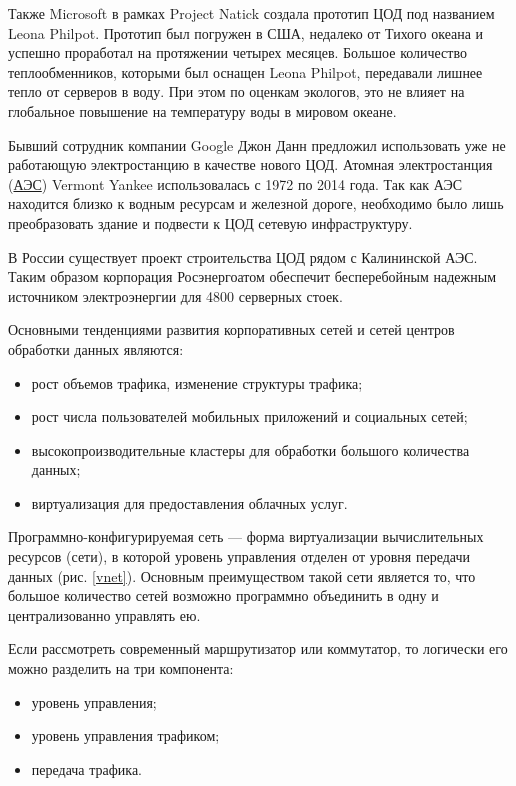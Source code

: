 Также Microsoft в рамках Project Natick создала прототип ЦОД под названием Leona Philpot.
Прототип был погружен в США, недалеко от Тихого океана и успешно проработал на протяжении четырех месяцев.
Большое количество теплообменников, которыми был оснащен Leona Philpot, передавали лишнее тепло от серверов в воду.
При этом по оценкам экологов, это не влияет на глобальное повышение на температуру воды в мировом океане.

Бывший сотрудник компании Google Джон Данн предложил использовать уже не работающую электростанцию в качестве нового ЦОД.
Атомная электростанция (\hyperlink{aes}{АЭС}) Vermont Yankee использовалась с 1972 по 2014 года.
Так как АЭС находится близко к водным ресурсам и железной дороге, необходимо было лишь преобразовать здание и подвести к ЦОД сетевую инфраструктуру.

В России существует проект строительства ЦОД рядом с Калининской АЭС.
Таким образом корпорация Росэнергоатом обеспечит бесперебойным надежным источником электроэнергии для 4800 серверных стоек.

Основными тенденциями развития корпоративных сетей и сетей центров обработки данных являются:
\begin{itemize}
  \item рост объемов трафика, изменение структуры трафика;
  \item рост числа пользователей мобильных приложений и социальных сетей;
  \item высокопроизводительные кластеры для обработки большого количества данных;
  \item виртуализация для предоставления облачных услуг.
\end{itemize}

Программно-конфигурируемая сеть --- форма виртуализации вычислительных ресурсов (сети), в которой уровень управления отделен от уровня передачи данных (рис. \ref{vnet}).
Основным преимуществом такой сети является то, что большое количество сетей возможно программно объединить в одну и централизованно управлять ею.


Если рассмотреть современный маршрутизатор или коммутатор, то логически его можно разделить на три компонента:
\begin{itemize}
  \item уровень управления;
  \item уровень управления трафиком;
  \item передача трафика.
\end{itemize}

